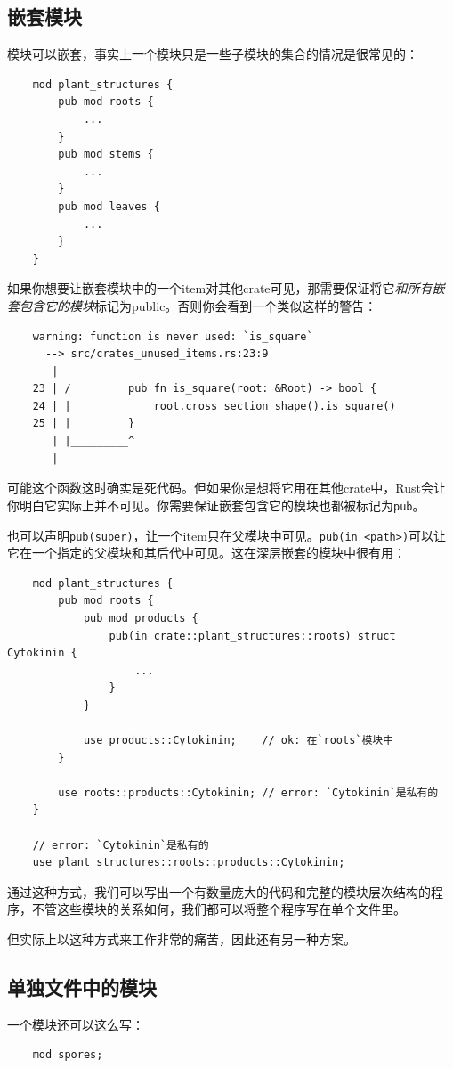 \subsection{嵌套模块}

模块可以嵌套，事实上一个模块只是一些子模块的集合的情况是很常见的：
\begin{verbatim}
    mod plant_structures {
        pub mod roots {
            ...
        }
        pub mod stems {
            ...
        }
        pub mod leaves {
            ...
        }
    }
\end{verbatim}

如果你想要让嵌套模块中的一个item对其他crate可见，那需要保证将它\emph{和所有嵌套包含它的模块}标记为public。否则你会看到一个类似这样的警告：
\begin{verbatim}
    warning: function is never used: `is_square`
      --> src/crates_unused_items.rs:23:9
       |
    23 | /         pub fn is_square(root: &Root) -> bool {
    24 | |             root.cross_section_shape().is_square()
    25 | |         }
       | |_________^
       |
\end{verbatim}

可能这个函数这时确实是死代码。但如果你是想将它用在其他crate中，Rust会让你明白它实际上并不可见。你需要保证嵌套包含它的模块也都被标记为\texttt{pub}。

也可以声明\texttt{pub(super)}，让一个item只在父模块中可见。\texttt{pub(in <path>)}可以让它在一个指定的父模块和其后代中可见。这在深层嵌套的模块中很有用：
\begin{verbatim}
    mod plant_structures {
        pub mod roots {
            pub mod products {
                pub(in crate::plant_structures::roots) struct Cytokinin {
                    ...
                }
            }

            use products::Cytokinin;    // ok: 在`roots`模块中
        }

        use roots::products::Cytokinin; // error: `Cytokinin`是私有的
    }

    // error: `Cytokinin`是私有的
    use plant_structures::roots::products::Cytokinin;
\end{verbatim}

通过这种方式，我们可以写出一个有数量庞大的代码和完整的模块层次结构的程序，不管这些模块的关系如何，我们都可以将整个程序写在单个文件里。

但实际上以这种方式来工作非常的痛苦，因此还有另一种方案。

\subsection{单独文件中的模块}
一个模块还可以这么写：
\begin{verbatim}
    mod spores;
\end{verbatim}

